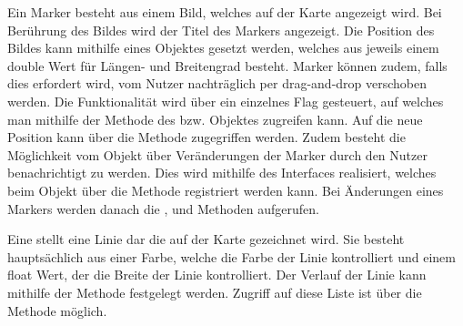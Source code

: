 Ein Marker besteht aus einem Bild, welches auf der Karte angezeigt wird. Bei Berührung des Bildes wird der Titel des Markers angezeigt. Die Position des Bildes kann mithilfe eines  Objektes gesetzt werden, welches aus jeweils einem double Wert für Längen- und Breitengrad besteht. Marker können zudem, falls dies erfordert wird, vom Nutzer nachträglich per drag-and-drop verschoben werden. Die Funktionalität wird über ein einzelnes Flag gesteuert, auf welches man mithilfe der  Methode des  bzw.  Objektes zugreifen kann. Auf die neue Position kann über die  Methode zugegriffen werden. Zudem besteht die Möglichkeit vom  Objekt über Veränderungen der Marker durch den Nutzer benachrichtigt zu werden. Dies wird mithilfe des  Interfaces realisiert, welches beim  Objekt über die  Methode registriert werden kann. Bei Änderungen eines Markers werden danach die ,  und  Methoden aufgerufen.
	
Eine  stellt eine Linie dar die auf der Karte gezeichnet wird. Sie besteht hauptsächlich aus einer Farbe, welche die Farbe der Linie kontrolliert und einem float Wert, der die Breite der Linie kontrolliert. Der Verlauf der Linie kann mithilfe der  Methode festgelegt werden. Zugriff auf diese Liste ist über die  Methode möglich.

